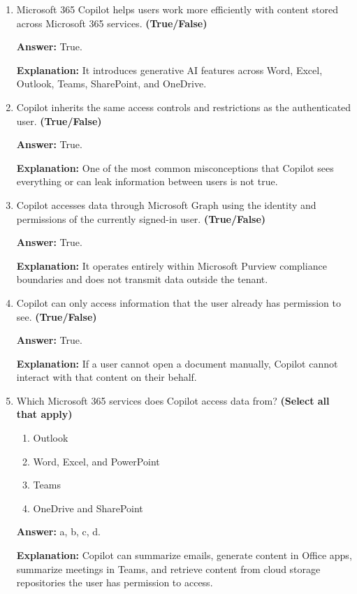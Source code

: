 \documentclass[10pt]{article}
\begin{document}
\begin{enumerate}[leftmargin=*]

\item Microsoft 365 Copilot helps users work more efficiently with content stored across Microsoft 365 services. \textbf{(True/False)}

\textbf{Answer:} True.

\textbf{Explanation:} It introduces generative AI features across Word, Excel, Outlook, Teams, SharePoint, and OneDrive.

\item Copilot inherits the same access controls and restrictions as the authenticated user. \textbf{(True/False)}

\textbf{Answer:} True.

\textbf{Explanation:} One of the most common misconceptions that Copilot sees everything or can leak information between users is not true.

\item Copilot accesses data through Microsoft Graph using the identity and permissions of the currently signed-in user. \textbf{(True/False)}

\textbf{Answer:} True.

\textbf{Explanation:} It operates entirely within Microsoft Purview compliance boundaries and does not transmit data outside the tenant.

\item Copilot can only access information that the user already has permission to see. \textbf{(True/False)}

\textbf{Answer:} True.

\textbf{Explanation:} If a user cannot open a document manually, Copilot cannot interact with that content on their behalf.

\item Which Microsoft 365 services does Copilot access data from? \textbf{(Select all that apply)}
\begin{enumerate}[label=\alph*., leftmargin=1.5em]
\item Outlook
\item Word, Excel, and PowerPoint
\item Teams
\item OneDrive and SharePoint
\end{enumerate}
\textbf{Answer:} a, b, c, d.

\textbf{Explanation:} Copilot can summarize emails, generate content in Office apps, summarize meetings in Teams, and retrieve content from cloud storage repositories the user has permission to access.


\end{enumerate}
\end{document}
